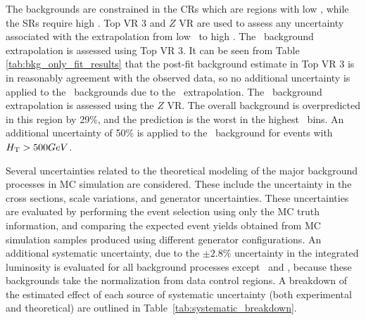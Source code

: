 The backgrounds are constrained in the CRs which are regions with low \HT,
while the SRs require high \HT.
Top VR 3 and $Z$ VR are used to assess any uncertainty associated with the
extrapolation from low \HT\ to high \HT.
The \TTBAR\ background extrapolation is assessed using Top VR 3. It can be seen
from Table \ref{tab:bkg_only_fit_results} that the post-fit background estimate
in Top VR 3 is in reasonably agreement with the observed data, so no additional
uncertainty is applied to the \TTBAR\ backgrounds due to the \HT\ extrapolation.
The \ZGAMMAJETS\ background extrapolation is assessed using the $Z$ VR.
The overall background is overpredicted in this region by 29\%, and the
prediction is the worst in the highest \HT\ bins.
An additional uncertainty of 50\% is applied to the \ZGAMMAJETS\ background
for events with $H_{\mathrm{T}} > 500 GeV$.

Several uncertainties related to the theoretical modeling of the major
background processes in MC simulation are considered.
These include the uncertainty in the cross sections, scale variations, and
generator uncertainties.
These uncertainties are evaluated by performing the event selection using only
the MC truth information, and comparing the expected event yields obtained
from MC simulation samples produced using different generator configurations.
An additional systematic uncertainty, due to the $\pm 2.8$\% uncertainty in the
integrated luminosity is evaluated for all background processes except
\TTBAR\ and \ZGAMMAJETS, because these backgrounds take the normalization from
data control regions.
A breakdown of the estimated effect of each source of systematic uncertainty
(both experimental and theoretical) are outlined in
Table~\ref{tab:systematic_breakdown}.

